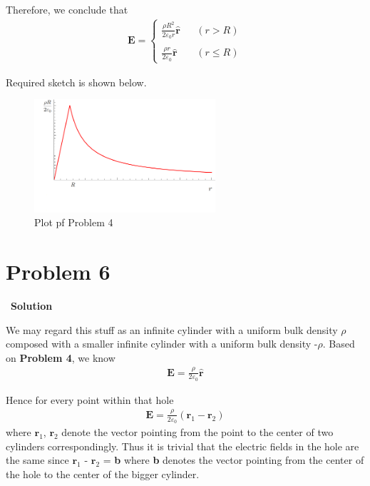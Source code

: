 \documentclass[12pt,a4paper]{article}
\begin{document}
Therefore, we conclude that
\begin{align*}
    \textbf{E} = 
    \left\{
        \begin{array}{lcl}
            \frac{\rho R^2}{2\varepsilon_0 r} \hat{\textbf{r}} & & (r > R) \\
              \\
            \frac{\rho r}{2\varepsilon_0} \hat{\textbf{r}} & & (r \leq R)
        \end{array}
    \right.
\end{align*}

Required sketch is shown below.
\begin{figure}[!htpb]
    \centering
    \includegraphics[width=0.6\textwidth]{hw2-p4-plot.png}
    \caption{Plot pf Problem 4}
    \label{fig:4-plot}
\end{figure}

\section*{\large \textbf{Problem 6}}~{\textbf{Solution}}

We may regard this stuff as an infinite cylinder with a uniform bulk density $\rho$ composed with a smaller infinite cylinder with a uniform bulk density -$\rho$. Based on \textbf{Problem 4}, we know
\begin{align}
    \textbf{E} = \frac{\rho}{2\varepsilon_0} \hat{\textbf{r}}
\end{align}

Hence for every point within that hole
\begin{align}
    \textbf{E} = \frac{\rho}{2\varepsilon_0} \left( \textbf{r}_1 - \textbf{r}_2 \right)
\end{align}
where $\textbf{r}_1$, $\textbf{r}_2$ denote the vector pointing from the point to the center of two cylinders correspondingly. Thus it is trivial that the electric fields in the hole are the same since $\textbf{r}_1$ - $\textbf{r}_2$ = \textbf{b} where \textbf{b} denotes the vector pointing from the center of the hole to the center of the bigger cylinder.
\end{document}
